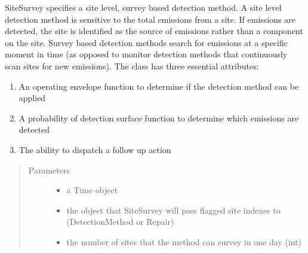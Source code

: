 \documentclass[letterpaper,10pt,english]{sphinxmanual}
\begin{document}
\begin{fulllineitems}
\label{\detokenize{index:feast.DetectionModules.site_survey.SiteSurvey}}
SiteSurvey specifies a site level, survey based detection method. A site level detection method is sensitive to
the total emissions from a site. If emissions are detected, the site is identified as the source of emissions
rather than a component on the site. Survey based detection methods search for emissions at a specific moment in
time (as opposed to monitor detection methods that continuously scan sites for new emissions).
The class has three essential attributes:
\begin{enumerate}
%
\item {} 
An operating envelope function to determine if the detection method can be applied

\item {} 
A probability of detection surface function to determine which emissions are detected

\item {} 
The ability to dispatch a follow up action

\end{enumerate}
\begin{quote}\begin{description}
\item[{Parameters}] \leavevmode\begin{itemize}
\item {} 
 \textendash{} a Time object

\item {} 
 \textendash{} the object that SiteSurvey will pass flagged site indexes to (DetectionMethod or Repair)

\item {} 
 \textendash{} the number of sites that the method can survey in one day (int)


\end{itemize}
\end{description}
\end{quote}
\end{fulllineitems}
\end{document}
